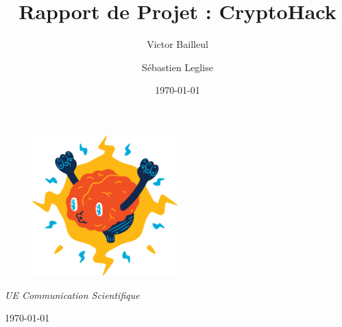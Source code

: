 \documentclass[12pt, a4paper]{article}
\title{Rapport de Projet : CryptoHack}
\author{Victor Bailleul \and Sébastien Leglise}
\date{\today}
\begin{document}
\begin{titlepage}
    \centering %

    \vspace*{1cm} %
    \begin{figure}[h!]
        \centering
        \includegraphics[width=0.5\textwidth]{Images/Others/logo_cryptohack.png}
            \end{figure}
    \vfill %

    {\Huge\bfseries \thetitle\par}
    \vspace{1cm} %

    {\Large\itshape UE Communication Scientifique\par}
    \vspace{1cm}

    {\Large \theauthor\par}
    \vspace{1cm} %

    {\large \today\par}


\end{titlepage}
\end{document}
